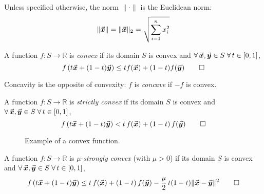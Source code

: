 Unless specified otherwise, the norm \(\|\cdot\|\) is the Euclidean norm:
\[
\|\vec{\boldsymbol{x}}\|=\|\vec{\boldsymbol{x}}\|_{2}=\sqrt{\sum_{i=1}^{n} x_{i}^{2}} 
\]



\begin{definition}\label{def:convex_function}
A function \(f:S\rightarrow\mathbb{R}\) is \emph{convex} if its domain $S$ is convex and \(\forall\, \vec{\boldsymbol{x}}, \vec{\boldsymbol{y}} \in S\; \forall\, t\in[0,1]\),
\[
f\left(t\vec{\boldsymbol{x}}+(1-t)\vec{\boldsymbol{y}}\right)\leq t f(\vec{\boldsymbol{x}})+(1-t)f(\vec{\boldsymbol{y}})
\qedhere
\]
\end{definition}

Concavity is the opposite of convexity: \(f\) is \emph{concave} if \(-f\) is convex.

\begin{definition}\label{def:strictly_convex_function}
A function \(f:S\rightarrow\mathbb{R}\) is \emph{strictly convex} if its domain $S$ is convex and \(\forall\, \vec{\boldsymbol{x}}, \vec{\boldsymbol{y}} \in S\; \forall\, t\in[0,1]\),
\[
f\left(t\vec{\boldsymbol{x}}+(1-t)\vec{\boldsymbol{y}}\right) < t\,f(\vec{\boldsymbol{x}})+(1-t)\,f(\vec{\boldsymbol{y}})
\qedhere
\]
\end{definition}

\begin{figure}[h]
\centering
{}
\caption*{Example of a convex function.}
\label{fig:convex_fun}
\end{figure}

\begin{definition}\label{def:mu_strongly_convex_function}
A function \(f:S\rightarrow\mathbb{R}\) is \(\mu\)-\emph{strongly convex} (with \(\mu>0\)) if its domain $S$ is convex and \(\forall\, \vec{\boldsymbol{x}}, \vec{\boldsymbol{y}} \in S\; \forall\, t\in[0,1]\),
\[
f\left(t\vec{\boldsymbol{x}}+(1-t)\vec{\boldsymbol{y}}\right) \leq t\,f(\vec{\boldsymbol{x}})+(1-t)\,f(\vec{\boldsymbol{y}}) -\frac{\mu}{2}\,t(1-t)\|\vec{\boldsymbol{x}}-\vec{\boldsymbol{y}}\|^{2}
\qedhere
\]
\end{definition}

